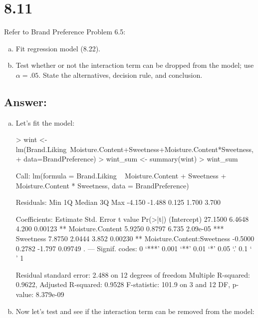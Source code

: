 \documentclass{article}
\begin{document}
\section{8.11}

Refer to Brand Preference Problem 6.5:

\begin{enumerate}[a)]
\item{} Fit regression model (8.22).
\item{} Test whether or not the interaction term can be dropped from the model; use $\alpha{} = .05$. State the alternatives, decision rule, and conclusion.
\end{enumerate}

\subsection{Answer:}

\begin{enumerate}[a)]
\item{} Let's fit the model:

\begin{Schunk}
\begin{Sinput}
> wint <- lm(Brand.Liking~Moisture.Content+Sweetness+Moisture.Content*Sweetness,
+            data=BrandPreference)
> wint_sum <- summary(wint)
> wint_sum
\end{Sinput}
\begin{Soutput}
Call:
lm(formula = Brand.Liking ~ Moisture.Content + Sweetness + Moisture.Content * 
    Sweetness, data = BrandPreference)

Residuals:
   Min     1Q Median     3Q    Max 
-4.150 -1.488  0.125  1.700  3.700 

Coefficients:
                           Estimate Std. Error t value Pr(>|t|)    
(Intercept)                 27.1500     6.4648   4.200  0.00123 ** 
Moisture.Content             5.9250     0.8797   6.735 2.09e-05 ***
Sweetness                    7.8750     2.0444   3.852  0.00230 ** 
Moisture.Content:Sweetness  -0.5000     0.2782  -1.797  0.09749 .  
---
Signif. codes:  0 ‘***’ 0.001 ‘**’ 0.01 ‘*’ 0.05 ‘.’ 0.1 ‘ ’ 1

Residual standard error: 2.488 on 12 degrees of freedom
Multiple R-squared:  0.9622,	Adjusted R-squared:  0.9528 
F-statistic: 101.9 on 3 and 12 DF,  p-value: 8.379e-09
\end{Soutput}
\end{Schunk}

\item{} Now let's test and see if the interaction term can be removed from the model:




\end{enumerate}
\end{document}

